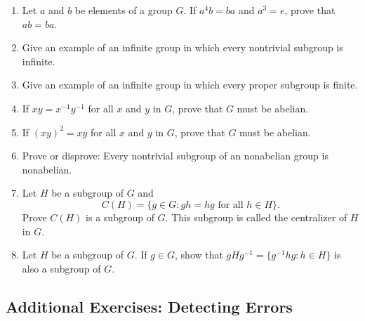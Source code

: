 {\begin{enumerate}
 
\item
Let $a$ and $b$ be elements of a group $G$. If $a^4b=ba$ and $a^3=e$,
prove that $ab=ba$.
 
 
\item
Give an example of an infinite group in which every nontrivial
subgroup is infinite.
 
 
\item
Give an example of an infinite group in which every proper subgroup is
finite. 
 
 
\item
If $xy = x^{-1} y^{-1}$ for all $x$ and $y$ in $G$, prove that $G$
must be abelian. 
 
 
\item
If $(xy)^2 = xy$ for all $x$ and $y$ in $G$, prove that $G$ must be
abelian.
 
 
\item
Prove or disprove: Every nontrivial subgroup of an nonabelian group is
nonabelian.
 
 
\item
Let $H$ be a subgroup of $G$ and
\[
C(H) = \{ g \in G : gh = hg \mbox{ for all $h \in H$}  \}.
\]
Prove $C(H)$ is a subgroup of $G$.  This subgroup is called the {\bfi
centralizer\/} of $H$ in $G$. 


\item
Let $H$ be a subgroup of $G$.  If $g \in G$, show that $gHg^{-1} =  \{g^{-1}hg : h\in H\}$ is also a subgroup of $G$.

 
\end{enumerate}
}
 
 
\subsection*{Additional Exercises: Detecting Errors}
 
